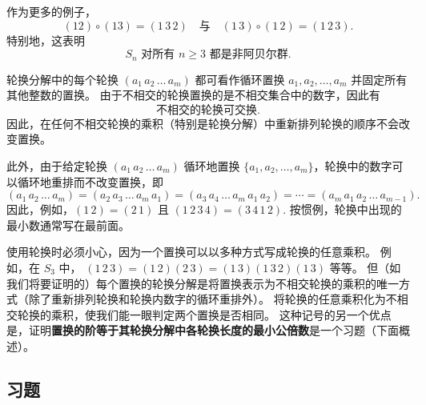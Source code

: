 作为更多的例子，
\[
(12) \circ (13) = (1 \, 3 \, 2) \quad \text{与} \quad (1 \, 3) \circ (1 \, 2) = (1 \, 2 \, 3).
\]
特别地，这表明
\[
S_n \text{ 对所有 } n \geq 3 \textbf{ 都是非阿贝尔群}.
\]

轮换分解中的每个轮换 \((a_1 \, a_2 \, \ldots \, a_m)\) 都可看作循环置换 \(a_1, a_2, \ldots, a_m\) 并固定所有其他整数的置换。
由于不相交的轮换置换的是不相交集合中的数字，因此有
\[
\textbf{不相交的轮换可交换}.
\]
因此，在任何不相交轮换的乘积（特别是轮换分解）中重新排列轮换的顺序不会改变置换。

此外，由于给定轮换 \((a_1 \, a_2 \, \ldots \, a_m)\) 循环地置换 \(\{a_1, a_2, \ldots, a_m\}\)，轮换中的数字可以循环地重排而不改变置换，即
\[
(a_1 \, a_2 \, \ldots \, a_m) = (a_2 \, a_3 \, \ldots \, a_m \, a_1) = (a_3 \, a_4 \, \ldots \, a_m \, a_1 \, a_2) = \cdots = (a_m \, a_1 \, a_2 \, \ldots \, a_{m-1}).
\]
因此，例如，\((1 \, 2) = (2 \, 1)\) 且 \((1 \, 2 \, 3 \, 4) = (3 \, 4 \, 1 \, 2)\). 
按惯例，轮换中出现的最小数通常写在最前面。

使用轮换时必须小心，因为一个置换可以以多种方式写成轮换的任意乘积。
例如，在 \(S_3\) 中，
\((1 \, 2 \, 3) = (1 \, 2)(2 \, 3) = (1 \, 3)(1 \, 3 \, 2)(1 \, 3)\) 等等。
但（如我们将要证明的）每个置换的轮换分解是将置换表示为不相交轮换的乘积的唯一方式（除了重新排列轮换和轮换内数字的循环重排外）。
将轮换的任意乘积化为不相交轮换的乘积，使我们能一眼判定两个置换是否相同。
这种记号的另一个优点是，证明\textbf{置换的阶等于其轮换分解中各轮换长度的最小公倍数}是一个习题（下面概述）。



\subsection*{习题}

